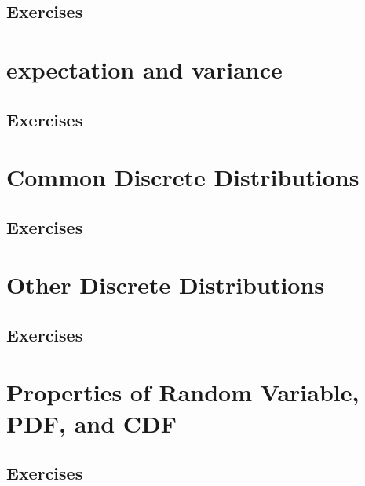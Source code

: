 \subsection{Exercises}

\section{expectation and variance}

\subsection{Exercises}

\section{Common Discrete Distributions}
\subsection{Exercises}

\section{Other Discrete Distributions}
\subsection{Exercises}

\section{Properties of Random Variable, PDF, and CDF}
\subsection{Exercises}



